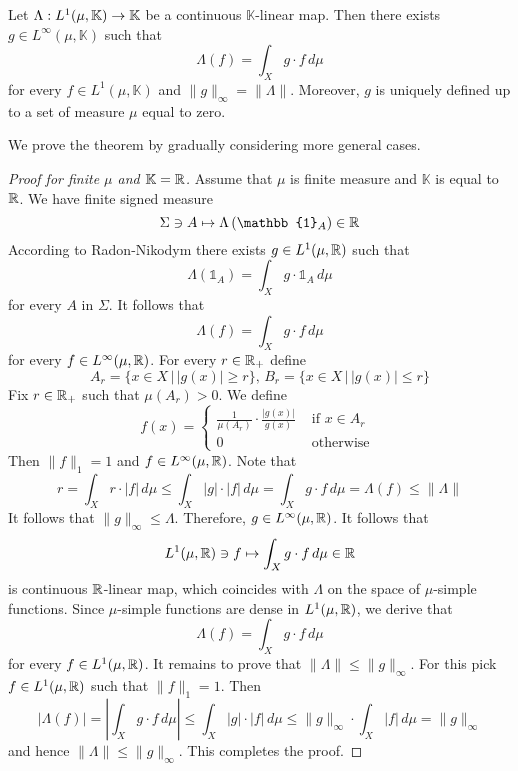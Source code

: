 \begin{theorem}\label{theorem:dual_to_L_1}
  Let $\Lambda:L^{1}(\mu,\mathbb{K})\rightarrow \mathbb{K}$ be a continuous $\mathbb{K}$-linear map. Then there exists $g \in L^{\infty}(\mu,\mathbb{K})$ such that
  $$\Lambda(f) = \int_Xg\cdot f\,d\mu$$
  for every $f \in L^1(\mu,\mathbb{K})$ and $\lVert g \rVert_{\infty} = \lVert \Lambda \rVert$. Moreover, $g$ is uniquely defined up to a set of measure $\mu$ equal to zero.
\end{theorem}
\noindent
We prove the theorem by gradually considering more general cases.

\begin{proof}[Proof for finite $\mu$ and $\mathbb{K}={\mathbb R}$]
  Assume that $\mu$ is finite measure and $\mathbb{K}$ is equal to ${\mathbb R}$. We have finite signed measure
  $$\Sigma \ni A \mapsto  \Lambda\left(\mathbb{1}_A\right) \in \RR$$
  According to Radon-Nikodym there exists $g \in L^1(\mu,{\mathbb R})$ such that
  $$\Lambda\left(\mathbb{1}_A\right) = \int_Xg\cdot \mathbb{1}_A\,d\mu$$
  for every $A$ in $\Sigma$. It follows that
  $$\Lambda(f) = \int_Xg\cdot f\,d\mu$$
  for every $f \in L^{\infty}(\mu,{\mathbb R})$. For every $r \in {\mathbb R}_+$ define
  $$A_r = \big\{x\in X\,\big|\,|g(x)|\geq r\big\},\,B_r = \big\{x\in X\,\big|\,|g(x)|\leq r\big\}$$
  Fix $r\in {\mathbb R}_+$ such that $\mu(A_r) > 0$. We define
  $$f(x) = \begin{cases}
      \frac{1}{\mu(A_r)}\cdot \frac{|g(x)|}{g(x)} & \mbox{ if }x\in A_r \\
      0                                           & \mbox{ otherwise }
    \end{cases}
  $$
  Then $\lVert f\rVert_1 = 1$ and $f \in L^{\infty}(\mu,{\mathbb R})$. Note that
  $$r = \int_X r\cdot |f|\,d\mu \leq \int_X |g|\cdot |f|\,d\mu =\int_X g \cdot  f\,d\mu = \Lambda(f) \leq \lVert \Lambda\rVert$$
  It follows that $\lVert g \rVert_{\infty} \leq \Lambda$. Therefore, $g \in L^{\infty}(\mu,{\mathbb R})$. It follows that
  $$L^1(\mu,{\mathbb R}) \ni f \mapsto \int_{X}g\cdot f\,d\mu \in {\mathbb R}$$
  is continuous ${\mathbb R}$-linear map, which coincides with $\Lambda$ on the space of $\mu$-simple functions. Since $\mu$-simple functions are dense in $L^1(\mu,{\mathbb R})$, we derive that
  $$\Lambda(f) = \int_{X}g\cdot f\,d\mu$$
  for every $f \in L^1(\mu,{\mathbb R})$. It remains to prove that $\lVert \Lambda \rVert \leq \lVert g\rVert_{\infty}$. For this pick $f \in L^1(\mu,{\mathbb R})$ such that $\lVert f \rVert_1 = 1$. Then
  $$\left|\Lambda(f)\right| = \left|\int_X g\cdot f \,d\mu \right| \leq \int_X|g|\cdot |f|\,d\mu \leq \lVert g \rVert_{\infty}\cdot \int_X|f|\,d\mu = \lVert g \rVert_{\infty}$$
  and hence $\lVert \Lambda \rVert \leq \lVert g\rVert_{\infty}$. This completes the proof.
\end{proof}

